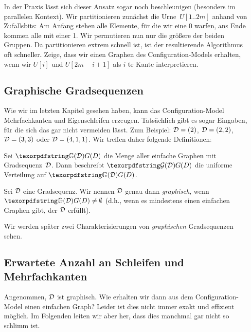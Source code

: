 \begin{exercise}
    In der Praxis lässt sich dieser Ansatz sogar noch beschleunigen (besonders im parallelen Kontext).
    Wir partitionieren zunächst die Urne~$U[1..2m]$ anhand von Zufallsbits:
    Am Anfang stehen alle Elemente, für die wir eine 0 warfen, ans Ende kommen alle mit einer 1.
    Wir permutieren nun nur die größere der beiden Gruppen.
    Da partitionieren extrem schnell ist, ist der resultierende Algorithmus oft schneller.
    Zeige, dass wir einen Graphen des Configuration-Models erhalten, wenn wir $U[i]$ und $U[2m - i + 1]$ als $i$-te Kante interpretieren.
\end{exercise}

\subsection{Graphische Gradsequenzen}
Wie wir im letzten Kapitel gesehen haben, kann das Configuration-Model Mehrfachkanten und Eigenschleifen erzeugen.
Tatsächlich gibt es sogar Eingaben, für die sich das gar nicht vermeiden lässt.
Zum Beispiel: $\mathcal{D} = (2)$, $\mathcal{D} = (2, 2)$, $\mathcal{D} = (3,3)$ oder $\mathcal{D} = (4, 1, 1)$.
Wir treffen daher folgende Definitionen:

\begin{definition}
    Sei $\gd$ die Menge aller einfache Graphen mit Gradsequenz~$\mathcal{D}$.
    Dann beschreibt $\Gd$ die uniforme Verteilung auf $\gd$.
\end{definition}

\begin{definition}
    Sei $\mathcal{D}$ eine Gradsequenz.
    Wir nennen $\mathcal{D}$ genau dann \emph{graphisch}, wenn $\gd \neq \emptyset$ (d.h., wenn es mindestens einen einfachen Graphen gibt, der $\mathcal{D}$ erfüllt).
\end{definition}

\noindent
Wir werden später zwei Charakterisierungen von \emph{graphischen} Gradsequenzen sehen.

\subsection{Erwartete Anzahl an Schleifen und Mehrfachkanten}\label{subsec:anzahl-illegaler-kanten}
Angenommen, $\mathcal{D}$ ist graphisch.
Wie erhalten wir dann aus dem Configuration-Model einen einfachen Graph?
Leider ist dies nicht immer exakt und effizient möglich.
Im Folgenden leiten wir aber her, dass dies manchmal gar nicht so schlimm ist.

